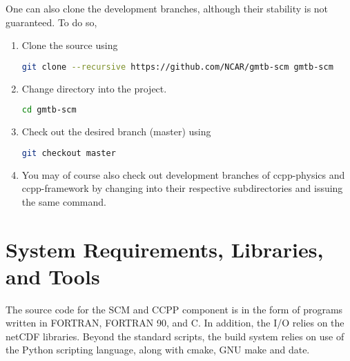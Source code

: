 One can also clone the development branches, although their stability is not guaranteed. To do so,
\begin{enumerate}
    \item Clone the source using
\begin{lstlisting}[language=bash]
git clone --recursive https://github.com/NCAR/gmtb-scm gmtb-scm
\end{lstlisting}
\item Change directory into the project.
\begin{lstlisting}[language=bash]
cd gmtb-scm
\end{lstlisting}
\item Check out the desired branch (master) using
\begin{lstlisting}[language=bash]
git checkout master
\end{lstlisting}
\item You may of course also check out development branches of ccpp-physics and ccpp-framework by changing into their respective subdirectories and issuing the same  command.
\end{enumerate}


\section{System Requirements, Libraries, and Tools}
\label{section: systemrequirements}

The source code for the SCM and CCPP component is in the form of programs written in FORTRAN, FORTRAN 90, and C. In addition, the I/O relies on the netCDF libraries. Beyond the standard scripts, the build system relies on use of the Python scripting language, along with cmake, GNU make and date.

